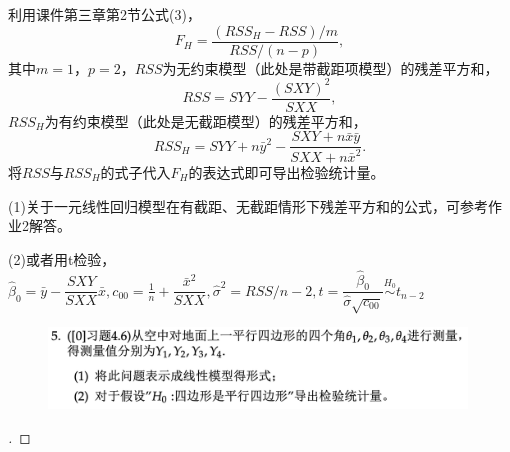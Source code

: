 \documentclass[cn,hazy,green,12pt,normal]{elegantnote}
\numberwithin{equation}{section}
\numberwithin{subsection}{section}
\begin{document}
利用课件第三章第2节公式(3)，
$$
F_H = \frac{(RSS_H - RSS)/m}{RSS/(n-p)},
$$
其中$m=1$，$p=2$，$RSS$为无约束模型（此处是带截距项模型）的残差平方和，
$$
RSS = SYY - \frac{(SXY)^2}{SXX},
$$
$RSS_H$为有约束模型（此处是无截距模型）的残差平方和，
$$
RSS_H = SYY + n \bar{y}^2 - \frac{SXY + n \bar{x} \bar{y}}{SXX + n \bar{x}^2}.
$$
将$RSS$与$RSS_H$的式子代入$F_H$的表达式即可导出检验统计量。

\begin{note}
    (1)关于一元线性回归模型在有截距、无截距情形下残差平方和的公式，可参考作业2解答。

    \noindent (2)或者用t检验，$\hat{\beta}_0=\bar{y}-\dfrac{SXY}{SXX}\bar{x}, c_{00} = \frac{1}{n} + \dfrac{\bar{x}^2}{SXX}, \hat{\sigma}^2 = RSS/n-2, t = \dfrac{\hat{\beta}_0}{\hat{\sigma}\sqrt{c_{00}}}\overset{H_0}{\sim}t_{n-2}$
\end{note}

\newpage

\begin{homework}
\end{homework}

    \begin{figure}[!htbp]
        \centering
        \includegraphics[width=30em]{image/hw4_plt5.png}
    \end{figure}

\begin{proof}[\solutionname]
\end{proof}
\end{document}
